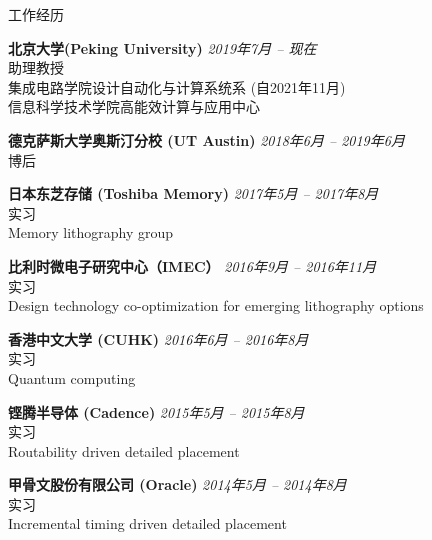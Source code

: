 
\begin{rSection}{工作经历}

{\bf 北京大学(Peking University)}                           \hfill {\em 2019年7月 -- 现在} \\
助理教授 \\
集成电路学院设计自动化与计算系统系 (自2021年11月) \\
信息科学技术学院高能效计算与应用中心

{\bf 德克萨斯大学奥斯汀分校 (UT Austin)}                           \hfill {\em 2018年6月 -- 2019年6月} \\
博后

{\bf 日本东芝存储 (Toshiba Memory) }                           \hfill {\em 2017年5月 -- 2017年8月} \\
实习 \\
Memory lithography group

{\bf 比利时微电子研究中心（IMEC）}                           \hfill {\em 2016年9月 -- 2016年11月} \\
实习 \\
Design technology co-optimization for emerging lithography options

{\bf 香港中文大学 (CUHK)}                           \hfill {\em 2016年6月 -- 2016年8月} \\
实习 \\
Quantum computing

{\bf 铿腾半导体 (Cadence)}                           \hfill {\em 2015年5月 -- 2015年8月} \\
实习 \\
Routability driven detailed placement

{\bf 甲骨文股份有限公司 (Oracle)}                           \hfill {\em 2014年5月 -- 2014年8月} \\
实习 \\
Incremental timing driven detailed placement


\end{rSection}


